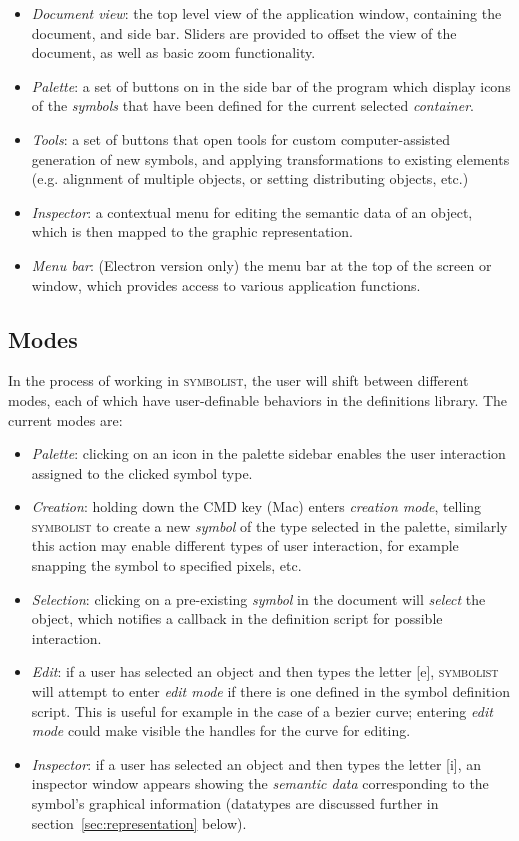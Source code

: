 \documentclass{article}
\def\symbolist{\textsc{symbolist}\xspace}
\begin{document}
\begin{itemize}\itemsep0pt 
\item 
\textit{Document view}: the top level view of the application window, containing the document, and side bar. Sliders are provided to offset the view of the document, as well as basic zoom functionality.
\item 
\textit{Palette}: a set of buttons on in the side bar of the program which display icons of the \textit{symbols} that have been defined for the current selected \textit{container}. 
\item 
\textit{Tools}: a set of buttons that open tools for custom computer-assisted generation of new symbols, and applying transformations to existing elements (e.g. alignment of multiple objects, or setting distributing objects, etc.)
\item 
\textit{Inspector}: a contextual menu for editing the semantic data of an object, which is then mapped to the graphic representation.
\item 
\textit{Menu bar}: (Electron version only) the menu bar at the top of the screen or window, which provides access to various application functions.
\end{itemize}

\subsection{Modes}\label{sec:modes}

In the process of working in \symbolist, the user will shift between different modes, each of which have user-definable behaviors in the definitions library.
The current modes are:
\begin{itemize}\itemsep0pt 
\item \textit{Palette}: clicking on an icon in the palette sidebar enables the user interaction assigned to the clicked symbol type.
\item \textit{Creation}: holding down the CMD key (Mac) enters \textit{creation mode}, telling \symbolist to create a new \textit{symbol} of the type selected in the palette, similarly this action may enable different types of user interaction, for example snapping the symbol to specified pixels, etc.
\item \textit{Selection}: clicking on a pre-existing \textit{symbol} in the document will \textit{select} the object, which notifies a callback in the definition script for possible interaction.
\item \textit{Edit}: if a user has selected an object and then types the letter [e], \symbolist will attempt to enter \textit{edit mode} if there is one defined in the symbol definition script. This is useful for example in the case of a bezier curve; entering \textit{edit mode} could make visible the handles for the curve for editing.
\item \textit{Inspector}: if a user has selected an object and then types the letter [i], an inspector window appears showing the \textit{semantic data} corresponding to the symbol's graphical information (datatypes are discussed further in section~\ref{sec:representation} below).
\end{itemize}
\end{document}
